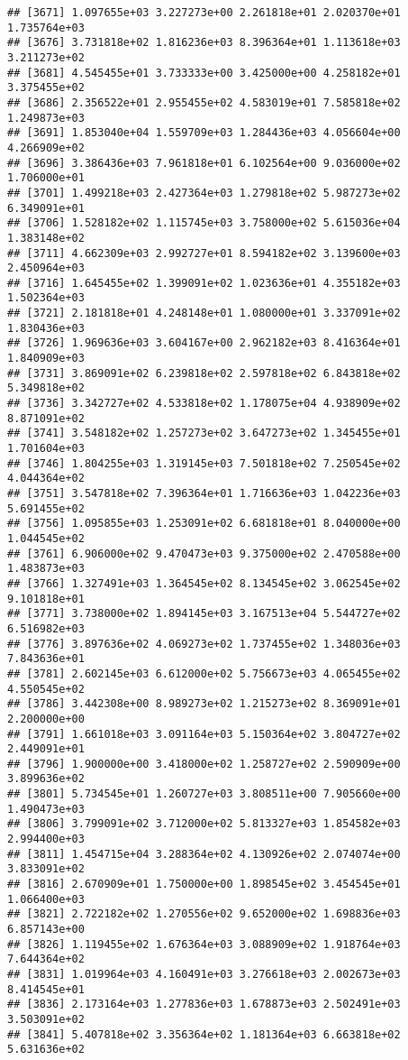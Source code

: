 \documentclass[]{article}
\begin{document}
\begin{verbatim}
## [3671] 1.097655e+03 3.227273e+00 2.261818e+01 2.020370e+01 1.735764e+03
## [3676] 3.731818e+02 1.816236e+03 8.396364e+01 1.113618e+03 3.211273e+02
## [3681] 4.545455e+01 3.733333e+00 3.425000e+00 4.258182e+01 3.375455e+02
## [3686] 2.356522e+01 2.955455e+02 4.583019e+01 7.585818e+02 1.249873e+03
## [3691] 1.853040e+04 1.559709e+03 1.284436e+03 4.056604e+00 4.266909e+02
## [3696] 3.386436e+03 7.961818e+01 6.102564e+00 9.036000e+02 1.706000e+01
## [3701] 1.499218e+03 2.427364e+03 1.279818e+02 5.987273e+02 6.349091e+01
## [3706] 1.528182e+02 1.115745e+03 3.758000e+02 5.615036e+04 1.383148e+02
## [3711] 4.662309e+03 2.992727e+01 8.594182e+02 3.139600e+03 2.450964e+03
## [3716] 1.645455e+02 1.399091e+02 1.023636e+01 4.355182e+03 1.502364e+03
## [3721] 2.181818e+01 4.248148e+01 1.080000e+01 3.337091e+02 1.830436e+03
## [3726] 1.969636e+03 3.604167e+00 2.962182e+03 8.416364e+01 1.840909e+03
## [3731] 3.869091e+02 6.239818e+02 2.597818e+02 6.843818e+02 5.349818e+02
## [3736] 3.342727e+02 4.533818e+02 1.178075e+04 4.938909e+02 8.871091e+02
## [3741] 3.548182e+02 1.257273e+02 3.647273e+02 1.345455e+01 1.701604e+03
## [3746] 1.804255e+03 1.319145e+03 7.501818e+02 7.250545e+02 4.044364e+02
## [3751] 3.547818e+02 7.396364e+01 1.716636e+03 1.042236e+03 5.691455e+02
## [3756] 1.095855e+03 1.253091e+02 6.681818e+01 8.040000e+00 1.044545e+02
## [3761] 6.906000e+02 9.470473e+03 9.375000e+02 2.470588e+00 1.483873e+03
## [3766] 1.327491e+03 1.364545e+02 8.134545e+02 3.062545e+02 9.101818e+01
## [3771] 3.738000e+02 1.894145e+03 3.167513e+04 5.544727e+02 6.516982e+03
## [3776] 3.897636e+02 4.069273e+02 1.737455e+02 1.348036e+03 7.843636e+01
## [3781] 2.602145e+03 6.612000e+02 5.756673e+03 4.065455e+02 4.550545e+02
## [3786] 3.442308e+00 8.989273e+02 1.215273e+02 8.369091e+01 2.200000e+00
## [3791] 1.661018e+03 3.091164e+03 5.150364e+02 3.804727e+02 2.449091e+01
## [3796] 1.900000e+00 3.418000e+02 1.258727e+02 2.590909e+00 3.899636e+02
## [3801] 5.734545e+01 1.260727e+03 3.808511e+00 7.905660e+00 1.490473e+03
## [3806] 3.799091e+02 3.712000e+02 5.813327e+03 1.854582e+03 2.994400e+03
## [3811] 1.454715e+04 3.288364e+02 4.130926e+02 2.074074e+00 3.833091e+02
## [3816] 2.670909e+01 1.750000e+00 1.898545e+02 3.454545e+01 1.066400e+03
## [3821] 2.722182e+02 1.270556e+02 9.652000e+02 1.698836e+03 6.857143e+00
## [3826] 1.119455e+02 1.676364e+03 3.088909e+02 1.918764e+03 7.644364e+02
## [3831] 1.019964e+03 4.160491e+03 3.276618e+03 2.002673e+03 8.414545e+01
## [3836] 2.173164e+03 1.277836e+03 1.678873e+03 2.502491e+03 3.503091e+02
## [3841] 5.407818e+02 3.356364e+02 1.181364e+03 6.663818e+02 5.631636e+02

\end{verbatim}
\end{document}
